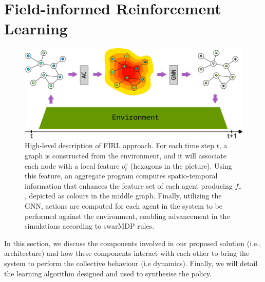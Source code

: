 \documentclass[conference]{IEEEtran}
\begin{document}
\section{Field-informed Reinforcement Learning}
\label{sec:approach}
\begin{figure}
	\centering
  \includegraphics[width=.98\linewidth]{imgs/architecture.pdf}

  \caption{High-level description of \ac{FIRL} approach. 
  For each time step $t$, a graph is constructed from the environment, and it will associate each node with a local feature $o^v_t$ (hexagons in the picture). 
  Using this feature, an aggregate program computes spatio-temporal information that enhances the feature set of each agent producing $f_v$, depicted as colours in the middle graph. 
  Finally, utilizing the GNN, actions are computed for each agent in the system to be performed against the environment, enabling advancement in the simulations according to swarMDP rules.
}  \label{fig:architecture}
\end{figure}
In this section, we discuss the components involved in our proposed solution (i.e., architecture) and how these components interact with each other to bring the system to perform the collective behaviour (i.e dynamics). Finally, we will detail the learning algorithm designed and used to synthesise the policy.
\end{document}
